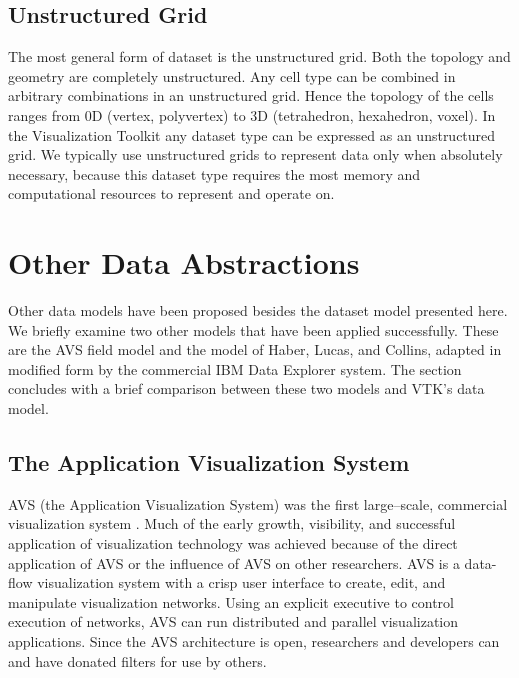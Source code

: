 \subsection{Unstructured Grid}

The most general form of dataset is the unstructured grid. Both the topology and geometry are completely unstructured. Any cell type can be combined in arbitrary combinations in an unstructured grid. Hence the topology of the cells ranges from 0D (vertex, polyvertex) to 3D (tetrahedron, hexahedron, voxel). In the Visualization Toolkit any dataset type can be expressed as an unstructured grid. We typically use unstructured grids to represent data only when absolutely necessary, because this dataset type requires the most memory and computational resources to represent and operate on.


\section{Other Data Abstractions}
\label{sec:other_data_abstractions}

Other data models have been proposed besides the dataset model presented here. We briefly examine two other models that have been applied successfully. These are the AVS field model and the model of Haber, Lucas, and Collins, adapted in modified form by the commercial IBM Data Explorer system. The section concludes with a brief comparison between these two models and VTK's data model.

\subsection{The Application Visualization System}

AVS (the Application Visualization System) was the first large--scale, commercial visualization system \cite{AVS89}. Much of the early growth, visibility, and successful application of visualization technology was achieved because of the direct application of AVS or the influence of AVS on other researchers. AVS is a data-flow visualization system with a crisp user interface to create, edit, and manipulate visualization networks. Using an explicit executive to control execution of networks, AVS can run distributed and parallel visualization applications. Since the AVS architecture is open, researchers and developers can and have donated filters for use by others.

